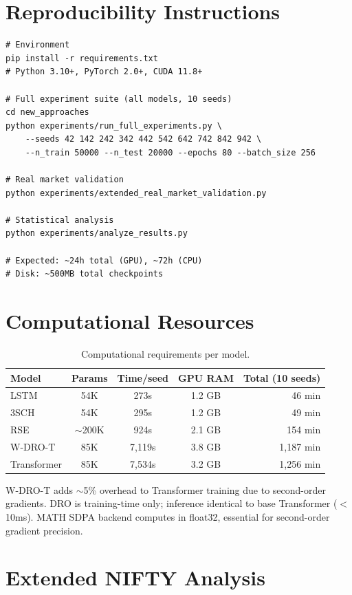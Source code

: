 \section{Reproducibility Instructions}
\label{app:reproduce}

\begin{verbatim}
# Environment
pip install -r requirements.txt
# Python 3.10+, PyTorch 2.0+, CUDA 11.8+

# Full experiment suite (all models, 10 seeds)
cd new_approaches
python experiments/run_full_experiments.py \
    --seeds 42 142 242 342 442 542 642 742 842 942 \
    --n_train 50000 --n_test 20000 --epochs 80 --batch_size 256

# Real market validation
python experiments/extended_real_market_validation.py

# Statistical analysis
python experiments/analyze_results.py

# Expected: ~24h total (GPU), ~72h (CPU)
# Disk: ~500MB total checkpoints
\end{verbatim}

\section{Computational Resources}
\label{app:compute}

\begin{table}[H]
\centering\small
\caption{Computational requirements per model.}
\begin{tabular}{@{}lcccr@{}}
\toprule
\textbf{Model} & \textbf{Params} & \textbf{Time/seed} & \textbf{GPU RAM} & \textbf{Total (10 seeds)} \\\midrule
LSTM & 54K & 273s & 1.2 GB & 46 min \\
3SCH & 54K & 295s & 1.2 GB & 49 min \\
RSE & $\sim$200K & 924s & 2.1 GB & 154 min \\
W-DRO-T & 85K & 7,119s & 3.8 GB & 1,187 min \\
Transformer & 85K & 7,534s & 3.2 GB & 1,256 min \\
\bottomrule
\end{tabular}
\end{table}

W-DRO-T adds $\sim$5\% overhead to Transformer training due to second-order gradients. DRO is training-time only; inference identical to base Transformer ($<$10ms). MATH SDPA backend computes in float32, essential for second-order gradient precision.

\section{Extended NIFTY Analysis}
\label{app:nifty}

